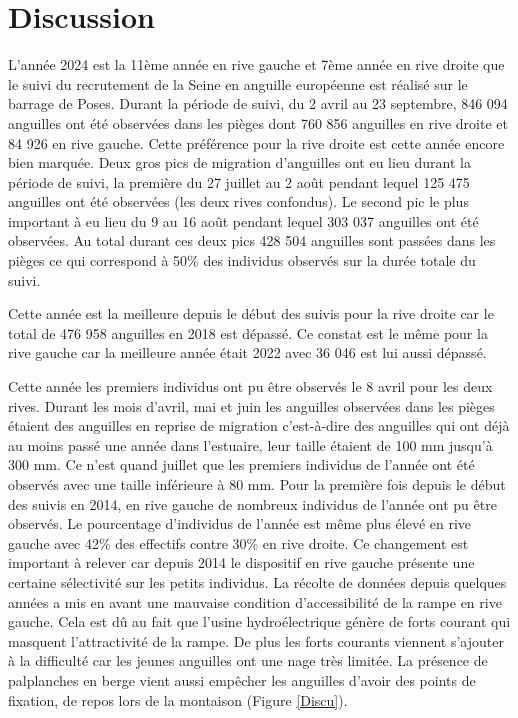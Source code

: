 \documentclass[11pt,titlepage,twoside]{article}\usepackage[]{graphicx}\usepackage[table]{xcolor}
\begin{document}
\section{Discussion}

L’année 2024 est la 11ème année en rive gauche et 7ème année en rive droite que le suivi du recrutement de la Seine en anguille européenne est réalisé sur le barrage de Poses. Durant la période de suivi, du 2 avril au 23 septembre, 846 094 anguilles ont été observées dans les pièges dont 760 856 anguilles en rive droite et 84 926 en rive gauche. Cette préférence pour la rive droite est cette année encore bien marquée. Deux gros pics de migration d’anguilles ont eu lieu durant la période de suivi, la première du 27 juillet au 2 août pendant lequel 125 475 anguilles ont été observées (les deux rives confondus). Le second pic le plus important à eu lieu du 9 au 16 août pendant lequel 303 037 anguilles ont été observées. Au total durant ces deux pics 428 504 anguilles sont passées dans les pièges ce qui correspond à 50\% des individus observés sur la durée totale du suivi. 

\vspace{0.5cm}
Cette année est la meilleure depuis le début des suivis pour la rive droite car le total de 476 958 anguilles en 2018 est dépassé. Ce constat est le même pour la rive gauche car la meilleure année était 2022 avec 36 046 est lui aussi dépassé. 

\vspace{0.5cm}
Cette année les premiers individus ont pu être observés le 8 avril pour les deux rives. Durant les mois d’avril, mai et juin les anguilles observées dans les pièges étaient des anguilles en reprise de migration c’est-à-dire des anguilles qui ont déjà au moins passé une année dans l’estuaire, leur taille étaient de 100 mm jusqu’à 300 mm. Ce n’est quand juillet que les premiers individus de l’année ont été observés avec une taille inférieure à 80 mm. Pour la première fois depuis le début des suivis en 2014, en rive gauche de nombreux individus de l’année ont pu être observés. Le pourcentage d’individus de l’année est même plus élevé en rive gauche avec 42\% des effectifs contre 30\% en rive droite. Ce changement est important à relever car depuis 2014 le dispositif en rive gauche présente une certaine sélectivité sur les petits individus. La récolte de données depuis quelques années a mis en avant une mauvaise condition d’accessibilité de la rampe en rive gauche. Cela est dû au fait que l’usine hydroélectrique génère de forts courant qui masquent l’attractivité de la rampe. De plus les forts courants viennent s’ajouter à la difficulté car les jeunes anguilles ont une nage très limitée. La présence de palplanches en berge vient aussi empêcher les anguilles d’avoir des points de fixation, de repos lors de la montaison (Figure \ref{Discu}). 
\end{document}

